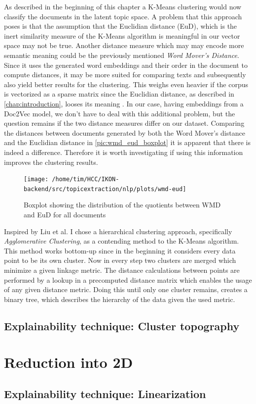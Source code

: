 As described in the beginning of this chapter a K-Means clustering would now classify the documents in the latent topic space. A problem that this approach poses is that the assumption that the Euclidian distance (EuD), which is the inert similarity measure of the K-Means algorithm  is meaningful in our vector space may not be true.  Another distance measure which may may encode more semantic meaning could be the previously mentioned \textit{Word Mover's Distance}. Since it uses the generated word embeddings and their order in the document to compute distances, it may be more suited for comparing texts and subsequently also yield better results for the clustering. This weighs even heavier if the corpus is vectorized as a sparse matrix since the Euclidian distance, as described in \autoref{chap:introduction}, looses its meaning . In our case, having embeddings from a Doc2Vec model, we don't have to deal with this additional problem, but the question remains if the two distance measures differ on our dataset.  
Comparing the distances between documents generated by both the Word Mover's distance and the Euclidian distance in \autoref{pic:wmd_eud_boxplot} it is apparent that there is indeed a difference. Therefore it is worth investigating if using this information improves the clustering results. 

\begin{figure}[t]
	\centering
	\texttt{[image: /home/tim/HCC/IKON-backend/src/topicextraction/nlp/plots/wmd-eud]}
	\caption{\label{pic:wmd_eud_boxplot} Boxplot showing the distribution of the quotients between WMD and EuD for all documents}
\end{figure}

Inspired by Liu et al. \cite{Liu:2018:INE:3219819.3220001} I chose a hierarchical clustering approach, specifically \textit{Agglomerative Clustering}, as a contending method to the K-Means algorithm. This method works bottom-up since in the beginning it considers every data point to be its own cluster. Now in every step two clusters are merged which minimize a given linkage metric. The distance calculations between points are performed by a lookup in a precomputed distance matrix which enables the usage of any given distance metric. Doing this until only one cluster remains, creates a binary tree, which describes the hierarchy of the data given the used metric. 



\subsection{Explainability technique: Cluster topography }

\section{Reduction into 2D}

\subsection{Explainability technique: Linearization}